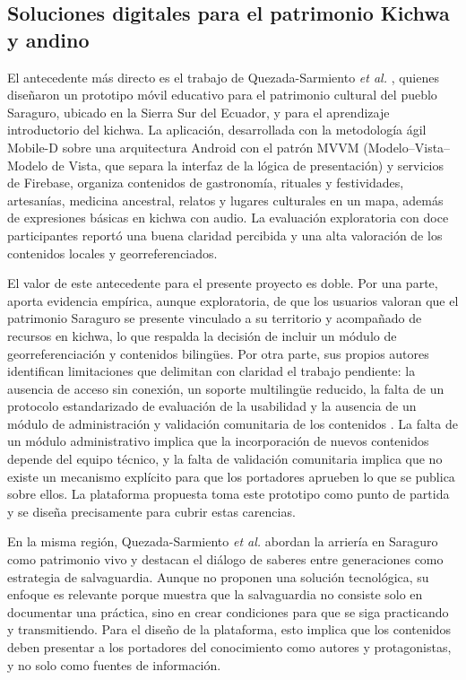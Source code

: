 \subsection{Soluciones digitales para el patrimonio Kichwa y andino}
El antecedente más directo es el trabajo de Quezada-Sarmiento \textit{et al.} \cite{quezada2026mobile}, quienes diseñaron un prototipo móvil educativo para el patrimonio cultural del pueblo Saraguro, ubicado en la Sierra Sur del Ecuador, y para el aprendizaje introductorio del kichwa. La aplicación, desarrollada con la metodología ágil Mobile-D \cite{abrahamsson2004mobiled} sobre una arquitectura Android con el patrón MVVM (Modelo--Vista--Modelo de Vista, que separa la interfaz de la lógica de presentación) y servicios de Firebase, organiza contenidos de gastronomía, rituales y festividades, artesanías, medicina ancestral, relatos y lugares culturales en un mapa, además de expresiones básicas en kichwa con audio. La evaluación exploratoria con doce participantes reportó una buena claridad percibida y una alta valoración de los contenidos locales y georreferenciados.

El valor de este antecedente para el presente proyecto es doble. Por una parte, aporta evidencia empírica, aunque exploratoria, de que los usuarios valoran que el patrimonio Saraguro se presente vinculado a su territorio y acompañado de recursos en kichwa, lo que respalda la decisión de incluir un módulo de georreferenciación y contenidos bilingües. Por otra parte, sus propios autores identifican limitaciones que delimitan con claridad el trabajo pendiente: la ausencia de acceso sin conexión, un soporte multilingüe reducido, la falta de un protocolo estandarizado de evaluación de la usabilidad y la ausencia de un módulo de administración y validación comunitaria de los contenidos \cite{quezada2026mobile}. La falta de un módulo administrativo implica que la incorporación de nuevos contenidos depende del equipo técnico, y la falta de validación comunitaria implica que no existe un mecanismo explícito para que los portadores aprueben lo que se publica sobre ellos. La plataforma propuesta toma este prototipo como punto de partida y se diseña precisamente para cubrir estas carencias.

En la misma región, Quezada-Sarmiento \textit{et al.} \cite{quezada2026muleteering} abordan la arriería en Saraguro como patrimonio vivo y destacan el diálogo de saberes entre generaciones como estrategia de salvaguardia. Aunque no proponen una solución tecnológica, su enfoque es relevante porque muestra que la salvaguardia no consiste solo en documentar una práctica, sino en crear condiciones para que se siga practicando y transmitiendo. Para el diseño de la plataforma, esto implica que los contenidos deben presentar a los portadores del conocimiento como autores y protagonistas, y no solo como fuentes de información.

